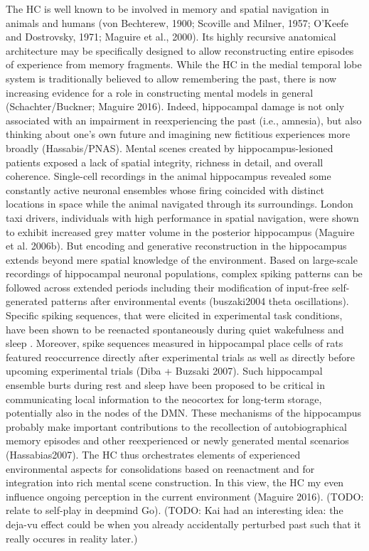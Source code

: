 \documentclass{article} %
\begin{document}
The HC is well known to be involved in memory and
spatial navigation in animals and humans
(von Bechterew, 1900; Scoville and Milner, 1957; O’Keefe and Dostrovsky, 1971; Maguire et al., 2000).
Its highly recursive anatomical architecture
may be specifically designed to allow reconstructing
entire episodes of experience from memory fragments.
%
While the HC in the medial temporal lobe system
is traditionally believed to allow remembering the past,
there is now increasing evidence for a role
in constructing mental models in general (Schachter/Buckner;
Maguire 2016).
Indeed,
hippocampal damage is
not only associated with an impairment in reexperiencing the past (i.e., amnesia),
but also thinking about one’s own future and
imagining new fictitious experiences more broadly (Hassabis/PNAS).
Mental scenes created by hippocampus-lesioned patients exposed a lack of
spatial integrity, richness in detail, and overall coherence.
%
Single-cell recordings in the animal hippocampus revealed
some constantly active neuronal ensembles whose firing coincided with
distinct locations in space while the animal navigated through its surroundings.
London taxi drivers, individuals with high performance in spatial navigation,
were shown to exhibit increased grey matter volume in the
posterior hippocampus (Maguire et al. 2006b).
But encoding and generative reconstruction in the hippocampus extends
beyond mere spatial knowledge of the environment.
Based on large-scale recordings of hippocampal neuronal populations,
complex spiking patterns can be followed across extended periods including
their modification of input-free self-generated patterns
after environmental events (buszaki2004 theta oscillations).
Specific spiking sequences, that were elicited in experimental task conditions,
have been shown to be reenacted spontaneously during
quiet wakefulness and sleep \citep{hartley2014space}.
Moreover, spike sequences measured in hippocampal place cells of rats
featured reoccurrence directly after experimental trials
as well as directly before upcoming experimental trials (Diba + Buzsaki 2007).
Such hippocampal ensemble burts during rest and sleep
have been proposed to be critical in communicating local information
to the neocortex for long-term storage, potentially also in the nodes of the DMN.
These mechanisms of the hippocampus probably make important contributions to the
recollection of autobiographical memory episodes and other
reexperienced or newly generated mental scenarios (Hassabias2007).
%
The HC thus orchestrates elements of experienced environmental aspects for
consolidations based on reenactment and for integration into
rich mental scene construction. In this view, the HC my even influence
ongoing perception in the current environment (Maguire 2016).
(TODO: relate to self-play in deepmind Go).
(TODO: Kai had an interesting idea: the deja-vu effect
could be when you already accidentally perturbed past
such that it really occures in reality later.)
\end{document}
